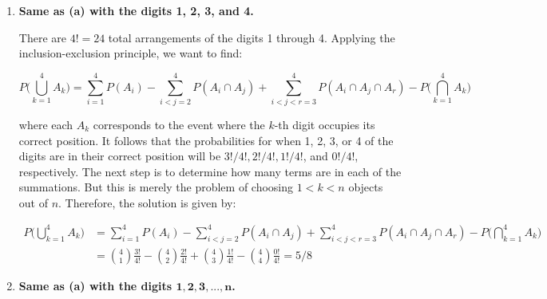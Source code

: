 \documentclass[10pt, oneside]{article}
\begin{document}
\begin{enumerate}[label=2.\arabic*]
\begin{enumerate}
	Similarly, the probability that \textbf{two} numbers will occupy their correct position is:
	
	\[ \frac{(n-2)!}{n!} \]
	
	and so on and so forth. For $n = 3$, the application of the inclusion-exclusion principle looks like:
	
	\begin{align*}
	P(A \cup B \cup C) &= P(A) + P(B) + P(C) - P(A \cap B) - P(A \cap C) - P(B \cap C) + P(A \cap B \cap C) \\
	&= \frac{2!}{3!} +  \frac{2!}{3!} +  \frac{2!}{3!} - \frac{1!}{3!} -  \frac{1!}{3!} -  \frac{1!}{3!} +  \frac{1!}{3!} = \boxed{2/3}
	\end{align*}
	\item \begin{tcolorbox}[
  colback=Cerulean!5!white,
  colframe=Cerulean!75!black] \textbf{Same as (a) with the digits 1, 2, 3, and 4.}
	\end{tcolorbox}
	
	There are $4! = 24$ total arrangements of the digits 1 through 4. Applying the inclusion-exclusion principle, we want to find:
	
	\[ P\Bigg( \bigcup^4_{k=1} A_k \Bigg) = \sum_{i = 1}^4 P(A_i) - \sum_{i < j = 2}^4 P(A_i \cap A_j) + \sum_{i < j < r = 3}^4 P(A_i \cap A_j \cap A_r) - P \Bigg( \bigcap^4_{k=1} A_k \Bigg) \]
	
	where each $A_k$ corresponds to the event where the $k$-th digit occupies its correct position. It follows that the probabilities for when 1, 2, 3, or 4 of the digits are in their correct position will be $3! / 4!, 2! / 4!, 1! / 4!$, and $0! / 4!$, respectively. The next step is to determine how many terms are in each of the summations. But this is merely the problem of choosing $1 < k < n$ objects out of $n$. Therefore, the solution is given by:
	
	\begin{align*}
	P\Bigg( \bigcup^4_{k=1} A_k \Bigg) &= \sum_{i = 1}^4 P(A_i) - \sum_{i < j = 2}^4 P(A_i \cap A_j) + \sum_{i < j < r = 3}^4 P(A_i \cap A_j \cap A_r) - P \Bigg( \bigcap^4_{k=1} A_k \Bigg)  \\
	&= \binom {4}{1} \frac{3!}{4!} - \binom {4}{2} \frac{2!}{4!} + \binom{4}{3} \frac{1!}{4!} - \binom{4}{4} \frac{0!}{4!} = \boxed{5/8}
	\end{align*}

\newpage
	\item  \begin{tcolorbox}[
  colback=Cerulean!5!white,
  colframe=Cerulean!75!black]
  \textbf{Same as (a) with the digits $\bm{1, 2, 3, ..., n}$. }
	\end{tcolorbox}
	

\end{enumerate}
\end{enumerate}
\end{document}

